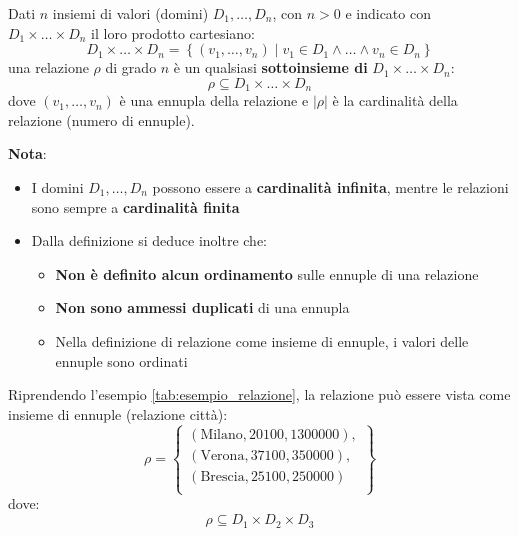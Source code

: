 \documentclass[a4paper,twoside]{article}
\begin{document}
\begin{definition}
  Dati \( n \) insiemi di valori (domini) \( D_1, \ldots, D_n \), con
  \( n > 0 \) e indicato con \( D_1 \times \ldots \times D_n \) il loro prodotto
  cartesiano:
  \[
    D_1 \times \ldots \times D_n = \left\{ (v_1, \ldots, v_n) \;\left|\; v_1 \in D_1 \wedge \ldots
    \wedge v_n \in D_n \right. \right\}
  \] 
  una relazione \( \rho \) di grado \( n \) è un qualsiasi \textbf{sottoinsieme di}
  \( D_1 \times \ldots \times D_n \):
  \[
    \rho \subseteq D_1 \times \ldots \times D_n
  \] 
  dove \( \left( v_1, \ldots, v_n \right) \) è una ennupla della relazione e \( |\rho| \) 
  è la cardinalità della relazione (numero di ennuple).

  \vspace{1em}
  \noindent
  \textbf{Nota}:
  \begin{itemize}
    \item I domini \( D_1, \ldots, D_n \) possono essere a \textbf{cardinalità infinita},
      mentre le relazioni sono sempre a \textbf{cardinalità finita}
    \item Dalla definizione si deduce inoltre che:
      \begin{itemize}
        \item \textbf{Non è definito alcun ordinamento} sulle ennuple di una relazione
        \item \textbf{Non sono ammessi duplicati} di una ennupla
        \item Nella definizione di relazione come insieme di ennuple, i valori delle
          ennuple sono ordinati
      \end{itemize}
  \end{itemize}
\end{definition}

\begin{example}
  Riprendendo l'esempio \ref{tab:esempio_relazione}, la relazione può essere vista come
  insieme di ennuple (relazione città):
  \[
      \rho = \left.\begin{cases}
        \left( \text{Milano}, 20100, 1300000 \right),\\
        \left( \text{Verona}, 37100, 350000 \right),\\
        \left( \text{Brescia}, 25100, 250000 \right)\\
      \end{cases}
      \right\}
  \] 
  dove:
  \[
    \rho \subseteq D_1 \times D_2 \times D_3
  \] 
\end{example}
\end{document}
